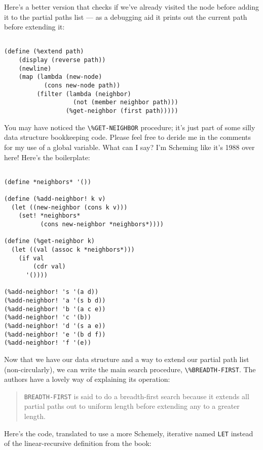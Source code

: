 \documentclass[12pt,openright,draft]{book}
\begin{document}
Here's a better version that checks if we've already visited the node
before adding it to the partial paths list --- as a debugging aid it
prints out the current path before extending it:

\begin{verbatim}

(define (%extend path)
    (display (reverse path))
    (newline)
    (map (lambda (new-node)
           (cons new-node path))
         (filter (lambda (neighbor)
                   (not (member neighbor path)))
                 (%get-neighbor (first path)))))

\end{verbatim}

You may have noticed the \verb|\%GET-NEIGHBOR| procedure; it's just
part of some silly data structure bookkeeping code.  Please feel free
to deride me in the comments for my use of a global variable.  What
can I say?  I'm Scheming like it's 1988 over here!  Here's the
boilerplate:

\begin{verbatim}

(define *neighbors* '())

(define (%add-neighbor! k v)
  (let ((new-neighbor (cons k v)))
    (set! *neighbors*
          (cons new-neighbor *neighbors*))))

(define (%get-neighbor k)
  (let ((val (assoc k *neighbors*)))
    (if val
        (cdr val)
      '())))

(%add-neighbor! 's '(a d))
(%add-neighbor! 'a '(s b d))
(%add-neighbor! 'b '(a c e))
(%add-neighbor! 'c '(b))
(%add-neighbor! 'd '(s a e))
(%add-neighbor! 'e '(b d f))
(%add-neighbor! 'f '(e))

\end{verbatim}

Now that we have our data structure and a way to extend our partial
path list (non-circularly), we can write the main search procedure,
\verb|\%BREADTH-FIRST|.  The authors have a lovely way of explaining
its operation:

\begin{quote}
\verb|BREADTH-FIRST| is said to do a breadth-first search because it
extends all partial paths out to uniform length before extending any
to a greater length.
\end{quote}

Here's the code, translated to use a more Schemely, iterative named
\verb|LET| instead of the linear-recursive definition from the book:
\end{document}
